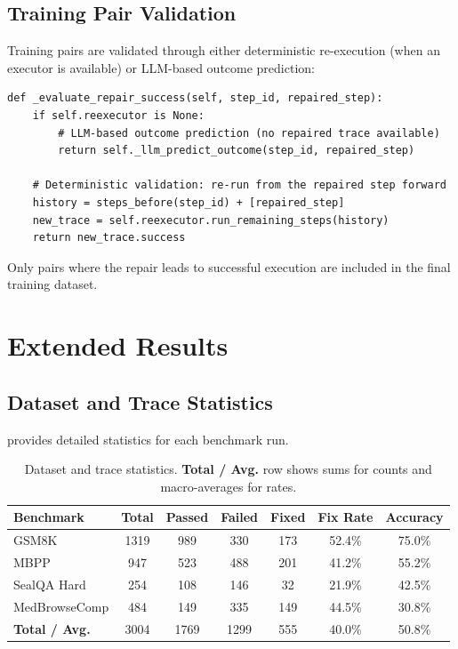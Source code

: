 \documentclass{article}
\theoremstyle{plain}
\theoremstyle{definition}
\theoremstyle{remark}
\begin{document}
\subsection{Training Pair Validation}

Training pairs are validated through either deterministic re-execution (when an executor is available) or LLM-based outcome prediction:

\begin{verbatim}
def _evaluate_repair_success(self, step_id, repaired_step):
    if self.reexecutor is None:
        # LLM-based outcome prediction (no repaired trace available)
        return self._llm_predict_outcome(step_id, repaired_step)

    # Deterministic validation: re-run from the repaired step forward
    history = steps_before(step_id) + [repaired_step]
    new_trace = self.reexecutor.run_remaining_steps(history)
    return new_trace.success
\end{verbatim}

Only pairs where the repair leads to successful execution are included in the final training dataset.


\section{Extended Results}

\subsection{Dataset and Trace Statistics}

 provides detailed statistics for each benchmark run.

\begin{table}[h]
  \caption{Dataset and trace statistics. \textbf{Total / Avg.} row shows sums for counts and macro-averages for rates.}
  \label{tab:dataset_stats}
  \centering
  \begin{small}
    \begin{tabular}{lcccccc}
      \toprule
      Benchmark & Total & Passed & Failed & Fixed & Fix Rate & Accuracy \\
      \midrule
      GSM8K & 1319 & 989 & 330 & 173 & 52.4\% & 75.0\% \\
      MBPP & 947 & 523 & 488 & 201 & 41.2\% & 55.2\% \\
      SealQA Hard & 254 & 108 & 146 & 32 & 21.9\% & 42.5\% \\
      MedBrowseComp & 484 & 149 & 335 & 149 & 44.5\% & 30.8\% \\
      \midrule
      \textbf{Total / Avg.} & 3004 & 1769 & 1299 & 555 & 40.0\% & 50.8\% \\
      \bottomrule
    \end{tabular}
  \end{small}
\end{table}
\end{document}
